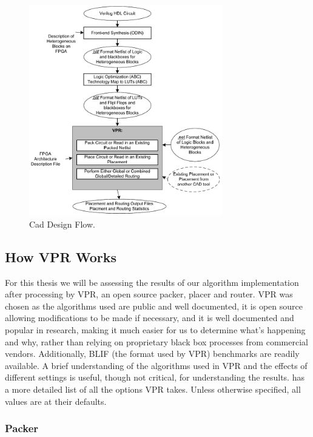 \documentclass[12pt,final,oneside]{dwThesis} %
\begin{document}
   \begin{figure} \begin{center}
         \includegraphics[width=0.75\textwidth]{images/vpr-cad.png}
         \caption{Cad Design Flow.\cite{VPRManual}} \label{CADFlow}
      \end{center} \end{figure}  \subsection{How \gls{VPR}
      Works}\label{VPRSection} For this thesis we will be assessing the results
   of our algorithm implementation after processing by \gls{VPR}, an open
   source packer, placer and router. \gls{VPR} was chosen as the algorithms
   used are public and well documented, it is open source allowing
   modifications to be made if necessary, and it is well documented and popular
   in research, making it much easier for us to determine what's happening and
   why, rather than relying on proprietary black box processes from commercial
   vendors. Additionally, \gls{BLIF} (the format used by \gls{VPR}) benchmarks
   are readily available.  A brief understanding of the algorithms used in
   \gls{VPR} and the effects of different settings is useful, though not
   critical, for understanding the results. \cite{VPRManual} has a more
   detailed list of all the options \gls{VPR} takes. Unless otherwise
   specified, all values are at their defaults.  \subsubsection{Packer}
\end{document}
